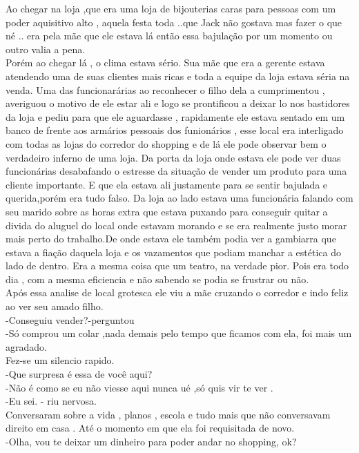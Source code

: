 \documentclass{book}
\begin{document}
Ao chegar na loja ,que era uma loja de bijouterias caras para pessoas com um poder aquisitivo alto , aquela festa toda ..que Jack não gostava mas fazer o que né .. era pela mãe que ele estava lá então essa bajulação por um momento ou outro valia a pena.\\
Porém ao chegar lá , o clima estava sério. Sua mãe que era a gerente estava atendendo uma de suas clientes mais ricas e toda a equipe da loja estava séria na venda. Uma das funcionarárias ao reconhecer o filho dela a cumprimentou , averiguou o motivo de ele estar ali e logo se prontificou a deixar lo nos bastidores da loja e pediu para que ele aguardasse , rapidamente ele estava sentado em um banco de frente aos armários pessoais dos funionários , esse local era interligado com todas as lojas do corredor do shopping e de lá ele pode observar bem o verdadeiro inferno de uma loja. Da porta da loja onde estava ele pode ver duas funcionárias desabafando o estresse da situação de vender um produto para uma cliente importante. E que ela estava ali justamente para se sentir bajulada e querida,porém era tudo falso. Da loja ao lado estava uma funcionária falando com seu marido sobre as horas extra que estava puxando para conseguir quitar a divida do aluguel do local onde estavam morando e se era realmente justo morar mais perto do trabalho.De onde estava ele também podia ver a gambiarra que estava a fiação daquela loja  e os vazamentos que podiam manchar a estética do lado de dentro. Era a mesma coisa que um teatro, na verdade pior. Pois era todo dia , com a mesma eficiencia e não sabendo se podia se frustrar ou não. \\
Após essa analise de local grotesca ele viu a mãe cruzando o corredor e indo feliz ao ver seu amado filho. \\
-Conseguiu vender?-perguntou \\
-Só comprou um colar ,nada demais pelo tempo que ficamos com ela, foi mais um agradado.\\
Fez-se um silencio rapido.\\
-Que surpresa é essa de você aqui?\\
-Não é como se eu não viesse aqui nunca ué ,só quis vir te ver .\\
-Eu sei. - riu nervosa.\\
Conversaram sobre a vida , planos , escola e tudo mais que não conversavam direito em casa . Até o momento em que ela foi requisitada de novo. \\
-Olha, vou te deixar um dinheiro para poder andar no shopping, ok?\\
\end{document}
